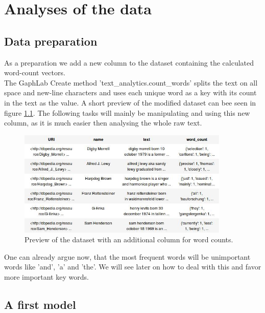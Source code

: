 \documentclass[12pt]{scrreprt}
\begin{document}
\chapter{Analyses of the data}
\label{chpt:tasks}

\section{Data preparation}

As a preparation we add a new column to the dataset containing the calculated word-count vectors.\\

The GaphLab Create method 'text\_analytics.count\_words' splits the text on all space and new-line characters and uses each unique word as a key with its count in the text as the value. A short preview of the modified dataset can bee seen in figure \ref{fig:dataset}. The following tasks will mainly be manipulating and using this new column, as it is much easier then analysing the whole raw text.\\

\begin{figure}[H]
  \begin{center}
    \caption{Preview of the dataset with an additional column for word counts.}
    \label{fig:dataset}
    \includegraphics[width=0.9\textwidth, angle=0]{db_wiki_word_counts.jpg}
  \end{center}
\end{figure}

One can already argue now, that the most frequent words will be unimportant words like 'and', 'a' and 'the'. We will see later on how to deal with this and favor more important key words.\\

\section{A first model}
\end{document}
